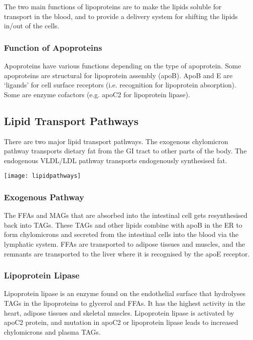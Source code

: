 The two main functions of lipoproteins are to make the lipids soluble for transport in the blood, and to provide a delivery system for shifting the lipids in/out of the cells.

\subsubsection{Function of Apoproteins}

Apoproteins have various functions depending on the type of apoprotein.
Some apoproteins are structural for lipoprotein assembly (apoB).
ApoB and E are `ligands' for cell surface receptors (i.e. recognition for lipoprotein absorption).
Some are enzyme cofactors (e.g. apoC2 for lipoprotein lipase).

\subsection{Lipid Transport Pathways}

There  are two major lipid transport pathways.
The exogenous chylomicron pathway transports dietary fat from the GI tract to other parts of the body.
The endogenous VLDL/LDL pathway transports endogenously synthesised fat.

\begin{center}
\texttt{[image: lipidpathways]}
\end{center}

\subsubsection{Exogenous Pathway}

The FFAs and MAGs that are absorbed into the intestinal cell gets resynthesised back into TAGs.
These TAGs and other lipids combine with apoB in the ER to form chylomicrons and secreted from the intestinal cells into the blood via the lymphatic system.
FFAs are transported to adipose tissues and muscles, and the remnants are transported to the liver where it is recognised by the apoE receptor.

\subsubsection{Lipoprotein Lipase}

Lipoprotein lipase is an enzyme found on the endothelial surface that hydrolyses TAGs in the lipoproteins to glycerol and FFAs.
It has the highest activity in the heart, adipose tissues and skeletal muscles.
Lipoprotein lipase is activated by apoC2 protein, and mutation in apoC2 or lipoprotein lipase leads to increased chylomicrons and plasma TAGs.

